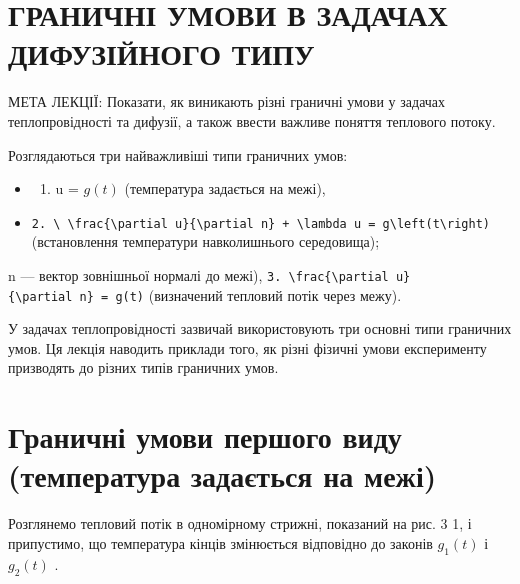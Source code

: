 \documentclass[
]{article}
\providecommand{\tightlist}{%
  \setlength{\itemsep}{0pt}\setlength{\parskip}{0pt}}
\begin{document}
\section{ГРАНИЧНІ УМОВИ В ЗАДАЧАХ ДИФУЗІЙНОГО
ТИПУ}\label{ux433ux440ux430ux43dux438ux447ux43dux456-ux443ux43cux43eux432ux438-ux432-ux437ux430ux434ux430ux447ux430ux445-ux434ux438ux444ux443ux437ux456ux439ux43dux43eux433ux43e-ux442ux438ux43fux443}

МЕТА ЛЕКЦІЇ: Показати, як виникають різні граничні умови у задачах
теплопровідності та дифузії, а також ввести важливе поняття теплового
потоку.

Розглядаються три найважливіші типи граничних умов:

\begin{itemize}
\tightlist
\item
  \begin{enumerate}
  \def\labelenumi{\arabic{enumi}.}
  \tightlist
  \item
    u = \(g(t)\) (температура задається на межі),
  \end{enumerate}
\item
  \texttt{2.\ \textbackslash{}\ \textbackslash{}frac\{\textbackslash{}partial\ u\}\{\textbackslash{}partial\ n\}\ +\ \textbackslash{}lambda\ u\ =\ g\textbackslash{}left(t\textbackslash{}right)}
  (встановлення температури навколишнього середовища);
\end{itemize}

n --- вектор зовнішньої нормалі до межі),
\texttt{3.\ \textbackslash{}frac\{\textbackslash{}partial\ u\}\{\textbackslash{}partial\ n\}\ =\ g(t)}
(визначений тепловий потік через межу).

У задачах теплопровідності зазвичай використовують три основні типи
граничних умов. Ця лекція наводить приклади того, як різні фізичні умови
експерименту призводять до різних типів граничних умов.

\section{Граничні умови першого виду (температура задається на
межі)}\label{ux433ux440ux430ux43dux438ux447ux43dux456-ux443ux43cux43eux432ux438-ux43fux435ux440ux448ux43eux433ux43e-ux432ux438ux434ux443-ux442ux435ux43cux43fux435ux440ux430ux442ux443ux440ux430-ux437ux430ux434ux430ux454ux442ux44cux441ux44f-ux43dux430-ux43cux435ux436ux456}

Розглянемо тепловий потік в одномірному стрижні, показаний на рис. 3 1,
і припустимо, що температура кінців змінюється відповідно до законів
\(g_1(t)\) і \(g_2(t)\) .
\end{document}
